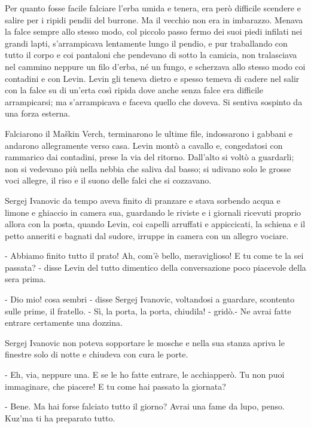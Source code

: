 Per quanto fosse facile falciare l'erba umida e tenera, era però difficile scendere e salire per i ripidi pendii del burrone. Ma il vecchio non era in imbarazzo. Menava la falce sempre allo stesso modo, col piccolo passo fermo dei suoi piedi infilati nei grandi lapti, s'arrampicava lentamente lungo il pendio, e pur traballando con tutto il corpo e coi pantaloni che pendevano di sotto la camicia, non tralasciava nel cammino neppure un filo d'erba, né un fungo, e scherzava allo stesso modo coi contadini e con Levin. Levin gli teneva dietro e spesso temeva di cadere nel salir con la falce su di un'erta così ripida dove anche senza falce era difficile arrampicarsi; ma s'arrampicava e faceva quello che doveva. Si sentiva sospinto da una forza esterna. 

\label{vi-2} 

Falciarono il Maškin Verch, terminarono le ultime file, indossarono i gabbani e andarono allegramente verso casa. Levin montò a cavallo e, congedatosi con rammarico dai contadini, prese la via del ritorno. Dall'alto si voltò a guardarli; non si vedevano più nella nebbia che saliva dal basso; si udivano solo le grosse voci allegre, il riso e il suono delle falci che si cozzavano. 

Sergej Ivanovic da tempo aveva finito di pranzare e stava sorbendo acqua e limone e ghiaccio in camera sua, guardando le riviste e i giornali ricevuti proprio allora con la posta, quando Levin, coi capelli arruffati e appiccicati, la schiena e il petto anneriti e bagnati dal sudore, irruppe in camera con un allegro vociare. 

- Abbiamo finito tutto il prato! Ah, com'è bello, meraviglioso! E tu come te la sei passata? - disse Levin del tutto dimentico della conversazione poco piacevole della sera prima. 

- Dio mio! cosa sembri - disse Sergej Ivanovic, voltandosi a guardare, scontento sulle prime, il fratello. - Sì, la porta, la porta, chiudila! - gridò.- Ne avrai fatte entrare certamente una dozzina. 

Sergej Ivanovic non poteva sopportare le mosche e nella sua stanza apriva le finestre solo di notte e chiudeva con cura le porte. 

- Eh, via, neppure una. E se le ho fatte entrare, le acchiapperò. Tu non puoi immaginare, che piacere! E tu come hai passato la giornata? 

- Bene. Ma hai forse falciato tutto il giorno? Avrai una fame da lupo, penso. Kuz'ma ti ha preparato tutto. 

